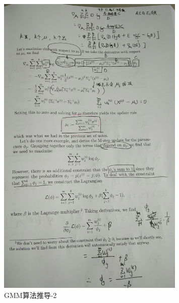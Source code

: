 \documentclass{ctexart}
\begin{document}
\begin{figure}[H]
\begin{center}
\includegraphics[width=0.8\textwidth]{fig/gmm2.jpg}  
\caption{GMM算法推导-2}
\end{center}
\end{figure}
\end{document}
